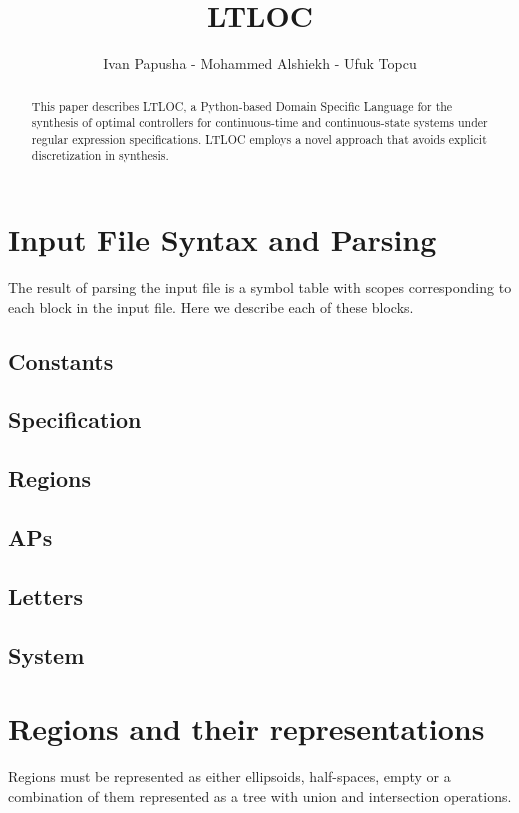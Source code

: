 \documentclass[letterpaper, 10 pt, conference]{ieeeconf}  %
\title{\LARGE \bf
LTLOC
}
\author{Ivan Papusha - Mohammed Alshiekh - Ufuk Topcu%
}
\begin{document}
\maketitle
\thispagestyle{empty}
\pagestyle{empty}


\begin{abstract}
This paper describes LTLOC, a Python-based Domain Specific Language for the synthesis of optimal controllers for continuous-time and continuous-state systems under regular expression specifications. LTLOC employs a novel approach that avoids explicit discretization in synthesis.
\end{abstract}

\section{Input File Syntax and Parsing}

The result of parsing the input file is a symbol table with scopes corresponding to each block in the input file. Here we describe each of these blocks.

\subsection{Constants}
\subsection{Specification}
\subsection{Regions}
\subsection{APs}
\subsection{Letters}
\subsection{System}

\section{Regions and their representations}

Regions must be represented as either ellipsoids, half-spaces, empty or a combination of them represented as a tree with union and intersection operations.
\end{document}
